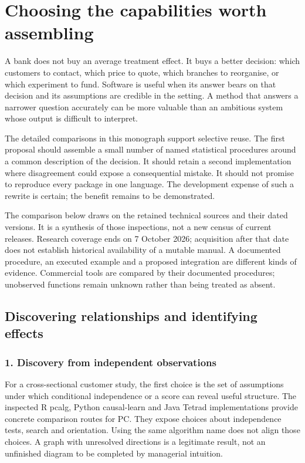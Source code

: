 \chapter{Choosing the capabilities worth assembling}
\label{scisyn:software}

A bank does not buy an average treatment effect. It buys a better decision:
which customers to contact, which price to quote, which branches to reorganise,
or which experiment to fund. Software is useful when its answer bears on that
decision and its assumptions are credible in the setting. A method that answers
a narrower question accurately can be more valuable than an ambitious system
whose output is difficult to interpret.

The detailed comparisons in this monograph support selective reuse. The first
proposal should assemble a small number of named statistical procedures around
a common description of the decision. It should retain a second implementation
where disagreement could expose a consequential mistake. It should not promise
to reproduce every package in one language. The development expense of such a
rewrite is certain; the benefit remains to be demonstrated.

The comparison below draws on the retained technical sources and their dated
versions. It is a synthesis of those inspections, not a new census of current
releases. Research coverage ends on 7 October 2026; acquisition after that date
does not establish historical availability of a mutable manual. A documented
procedure, an executed example and a proposed integration are different kinds
of evidence. Commercial tools are compared by their documented procedures;
unobserved functions remain unknown rather than being treated as absent.

\section{Discovering relationships and identifying effects}

\subsection{1. Discovery from independent observations}
For a cross-sectional customer study, the first choice is the set of assumptions
under which conditional independence or a score can reveal useful structure.
The inspected R pcalg, Python causal-learn and Java Tetrad implementations provide
concrete comparison routes for PC. They expose choices about independence tests,
search and orientation. Using the same algorithm name does not align those
choices. A graph with unresolved directions is a legitimate result, not an
unfinished diagram to be completed by managerial intuition.
\citep{exec13_pcalg_reuse_primary,v12_sw_causallearn,exec13_java_tetrad}

